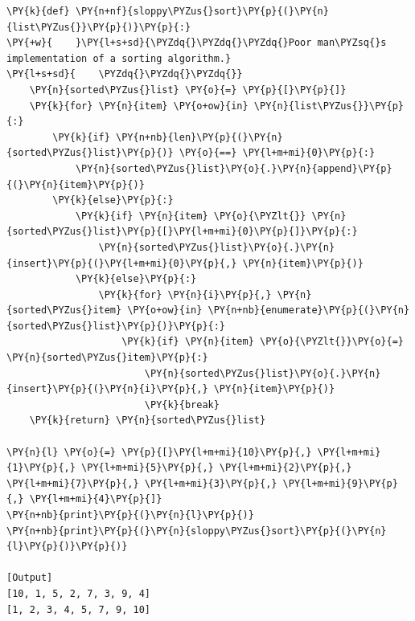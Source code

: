 \begin{Verbatim}[label=\makebox{\url{https://github.com/lucabaldini/cmepda/tree/master/slides/latex/snippets/sloppy\_sort.py}},commandchars=\\\{\}]
\PY{k}{def} \PY{n+nf}{sloppy\PYZus{}sort}\PY{p}{(}\PY{n}{list\PYZus{}}\PY{p}{)}\PY{p}{:}
\PY{+w}{    }\PY{l+s+sd}{\PYZdq{}\PYZdq{}\PYZdq{}Poor man\PYZsq{}s implementation of a sorting algorithm.}
\PY{l+s+sd}{    \PYZdq{}\PYZdq{}\PYZdq{}}
    \PY{n}{sorted\PYZus{}list} \PY{o}{=} \PY{p}{[}\PY{p}{]}
    \PY{k}{for} \PY{n}{item} \PY{o+ow}{in} \PY{n}{list\PYZus{}}\PY{p}{:}
        \PY{k}{if} \PY{n+nb}{len}\PY{p}{(}\PY{n}{sorted\PYZus{}list}\PY{p}{)} \PY{o}{==} \PY{l+m+mi}{0}\PY{p}{:}
            \PY{n}{sorted\PYZus{}list}\PY{o}{.}\PY{n}{append}\PY{p}{(}\PY{n}{item}\PY{p}{)}
        \PY{k}{else}\PY{p}{:}
            \PY{k}{if} \PY{n}{item} \PY{o}{\PYZlt{}} \PY{n}{sorted\PYZus{}list}\PY{p}{[}\PY{l+m+mi}{0}\PY{p}{]}\PY{p}{:}
                \PY{n}{sorted\PYZus{}list}\PY{o}{.}\PY{n}{insert}\PY{p}{(}\PY{l+m+mi}{0}\PY{p}{,} \PY{n}{item}\PY{p}{)}
            \PY{k}{else}\PY{p}{:}
                \PY{k}{for} \PY{n}{i}\PY{p}{,} \PY{n}{sorted\PYZus{}item} \PY{o+ow}{in} \PY{n+nb}{enumerate}\PY{p}{(}\PY{n}{sorted\PYZus{}list}\PY{p}{)}\PY{p}{:}
                    \PY{k}{if} \PY{n}{item} \PY{o}{\PYZlt{}}\PY{o}{=} \PY{n}{sorted\PYZus{}item}\PY{p}{:}
                        \PY{n}{sorted\PYZus{}list}\PY{o}{.}\PY{n}{insert}\PY{p}{(}\PY{n}{i}\PY{p}{,} \PY{n}{item}\PY{p}{)}
                        \PY{k}{break}
    \PY{k}{return} \PY{n}{sorted\PYZus{}list}

\PY{n}{l} \PY{o}{=} \PY{p}{[}\PY{l+m+mi}{10}\PY{p}{,} \PY{l+m+mi}{1}\PY{p}{,} \PY{l+m+mi}{5}\PY{p}{,} \PY{l+m+mi}{2}\PY{p}{,} \PY{l+m+mi}{7}\PY{p}{,} \PY{l+m+mi}{3}\PY{p}{,} \PY{l+m+mi}{9}\PY{p}{,} \PY{l+m+mi}{4}\PY{p}{]}
\PY{n+nb}{print}\PY{p}{(}\PY{n}{l}\PY{p}{)}
\PY{n+nb}{print}\PY{p}{(}\PY{n}{sloppy\PYZus{}sort}\PY{p}{(}\PY{n}{l}\PY{p}{)}\PY{p}{)}

[Output]
[10, 1, 5, 2, 7, 3, 9, 4]
[1, 2, 3, 4, 5, 7, 9, 10]
\end{Verbatim}